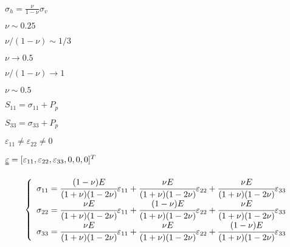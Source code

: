 \documentclass[onecolumn,11pt]{report}
\def\lthtmlcheckvsize{\ifdim\ht\sizebox<\vsize 
  \ifdim\wd\sizebox<\hsize\expandafter\hfill\fi \expandafter\vfill
  \else\expandafter\vss\fi}%
\begin{document}
{\newpage\clearpage
{}%
$\displaystyle \sigma_{h} = \frac{\nu}{1-\nu} \sigma_{v}$%
\lthtmlindisplaymathZ
\lthtmlcheckvsize\clearpage}

{\newpage\clearpage
{}%
$ \nu \sim 0.25$%
\lthtmlindisplaymathZ
\lthtmlcheckvsize\clearpage}

{\newpage\clearpage
{}%
$ \nu/(1-\nu) \sim 1/3 $%
\lthtmlindisplaymathZ
\lthtmlcheckvsize\clearpage}

{\newpage\clearpage
{}%
$ \nu \rightarrow 0.5$%
\lthtmlindisplaymathZ
\lthtmlcheckvsize\clearpage}

{\newpage\clearpage
{}%
$ \nu/(1-\nu) \rightarrow 1$%
\lthtmlindisplaymathZ
\lthtmlcheckvsize\clearpage}

{\newpage\clearpage
{}%
$ \nu \sim 0.5$%
\lthtmlindisplaymathZ
\lthtmlcheckvsize\clearpage}

{\newpage\clearpage
{}%
$ S_{11} = \sigma_{11} + P_p$%
\lthtmlindisplaymathZ
\lthtmlcheckvsize\clearpage}

{\newpage\clearpage
{}%
$ S_{33} = \sigma_{33} + P_p$%
\lthtmlindisplaymathZ
\lthtmlcheckvsize\clearpage}

{\newpage\clearpage
{}%
$ \varepsilon_{11} \neq \varepsilon_{22} \neq 0$%
\lthtmlindisplaymathZ
\lthtmlcheckvsize\clearpage}

{\newpage\clearpage
{}%
$ \uuline{\varepsilon} = [\varepsilon_{11},\varepsilon_{22},\varepsilon_{33},0,0,0]^T$%
\lthtmlindisplaymathZ
\lthtmlcheckvsize\clearpage}

{\newpage\clearpage
{}%
\begin{displaymath}\left\lbrace
\begin{array}{l}
\sigma_{11} =
\cfrac{(1-\nu) E}{(1+\nu)(1-2\nu)} \varepsilon_{11}
+ \cfrac{\nu E}{(1+\nu)(1-2\nu)} \varepsilon_{22}
+ \cfrac{\nu E}{(1+\nu)(1-2\nu)} \varepsilon_{33} \\
\sigma_{22} =
\cfrac{\nu E}{(1+\nu)(1-2\nu)} \varepsilon_{11}
+ \cfrac{(1-\nu) E}{(1+\nu)(1-2\nu)} \varepsilon_{22}
+ \cfrac{\nu E}{(1+\nu)(1-2\nu)} \varepsilon_{33} \\
\sigma_{33} =
\cfrac{\nu E}{(1+\nu)(1-2\nu)} \varepsilon_{11}
+   \cfrac{\nu E}{(1+\nu)(1-2\nu)} \varepsilon_{22}
+	\cfrac{(1-\nu) E}{(1+\nu)(1-2\nu)} \varepsilon_{33}
\end{array}
\right.\end{displaymath}%
\lthtmldisplayZ
\lthtmlcheckvsize\clearpage}
\end{document}
